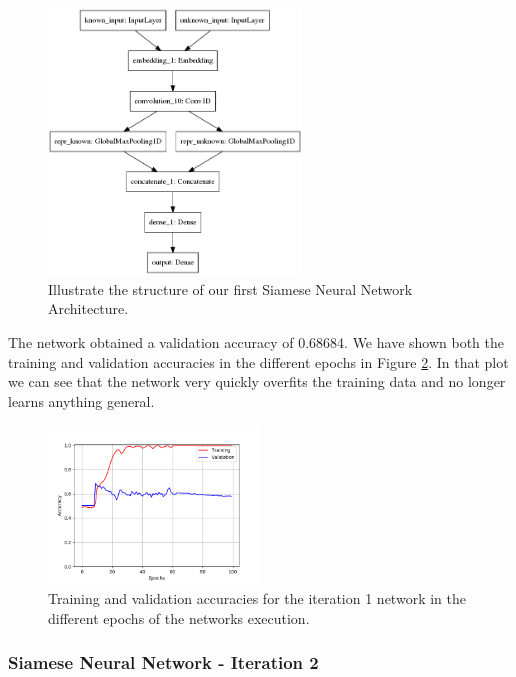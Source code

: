 \begin{figure}[htb]
    \centering
    \includegraphics[width=0.6\textwidth]{./pictures/experiments/network1.png}
    \caption{Illustrate the structure of our first Siamese Neural Network
        Architecture.}
    \label{fig:network_1}
\end{figure}

The network obtained a validation accuracy of 0.68684. We have shown both the
training and validation accuracies in the different epochs in Figure
\ref{fig:network1_accuracies}. In that plot we can see that the network very
quickly overfits the training data and no longer learns anything general.

\begin{figure}[htb]
    \centering
    \includegraphics[width=0.5\textwidth]{./pictures/experiments/network_1_accuracies.png}
    \caption{Training and validation accuracies for the iteration 1 network in
        the different epochs of the networks execution.}
    \label{fig:network1_accuracies}
\end{figure}


\subsubsection{Siamese Neural Network - Iteration 2}

